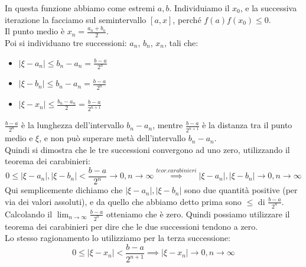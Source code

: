 In questa funzione abbiamo come estremi $a, b$. Individuiamo il  $x_0$, e la successiva iterazione la facciamo sul semintervallo $[a,x]$, perché $f(a) f(x_0)\leq 0$.\\
Il punto medio è $x_n=\frac{a_n+b_n}{2}$.\\
Poi si individuano tre successioni: ${a_n}$, ${b_n}$, ${x_n}$, tali che:
\begin{itemize}
    \item $|\xi-a_n|\leq b_n-a_n = \frac{b-a}{2^n}$
    \item $|\xi-b_n|\leq b_n-a_n = \frac{b-a}{2^n}$
    \item $|\xi-x_n|\leq \frac{b_n-a_n}{2} = \frac{b-a}{2^{n+1}}$
\end{itemize}
$\frac{b-a}{2^n}$ è la lunghezza dell'intervallo $b_n-a_n$, mentre $\frac{b-a}{2^{n+1}}$ è la distanza tra il punto medio e $\xi$, e non può superare metà dell'intervallo $b_n-a_n$.\\
Quindi si dimostra che le tre successioni convergono ad uno zero, utilizzando il teorema dei carabinieri:\\
\begin{displaymath}
    0 \leq |\xi-a_n|, |\xi-b_n| < \frac{b-a}{2^n}\to 0, n \to \infty \overset{teor. carabinieri}{\implies} |\xi-a_n|, |\xi-b_n| \to 0, n \to \infty
\end{displaymath}
Qui semplicemente dichiamo che $|\xi-a_n|, |\xi-b_n|$ sono due quantità positive (per via dei valori assoluti), e da quello che abbiamo detto prima sono $\leq$ di $ \frac{b-a}{2^n}$.\\
Calcolando il $\lim_{n\to \infty} \frac{b-a}{2^n}$ otteniamo che è zero. Quindi possiamo utilizzare il teorema dei carabinieri per dire che le due successioni tendono a zero.\\
Lo stesso ragionamento lo utilizziamo per la terza successione:
\begin{displaymath}
    0 \leq |\xi-x_n|< \frac{b-a}{2^{n+1}}\implies |\xi-x_n| \to 0, n\to \infty
\end{displaymath}